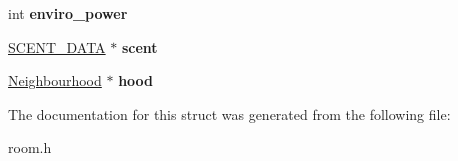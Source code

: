 \begin{DoxyCompactItemize}
\item 
\hypertarget{structroom__data_a1332388c4d8e9b6e70d4694c0c6fd7be}{int {\bfseries enviro\-\_\-power}}\label{structroom__data_a1332388c4d8e9b6e70d4694c0c6fd7be}

\item 
\hypertarget{structroom__data_a811c49ce5b3a76c01002b6137a2a95e8}{\hyperlink{structscent__data}{S\-C\-E\-N\-T\-\_\-\-D\-A\-T\-A} $\ast$ {\bfseries scent}}\label{structroom__data_a811c49ce5b3a76c01002b6137a2a95e8}

\item 
\hypertarget{structroom__data_a80cb0226783e1671bd5ba01f4d93ade9}{\hyperlink{classNeighbourhood}{Neighbourhood} $\ast$ {\bfseries hood}}\label{structroom__data_a80cb0226783e1671bd5ba01f4d93ade9}

\end{DoxyCompactItemize}


The documentation for this struct was generated from the following file\-:\begin{DoxyCompactItemize}
\item 
room.\-h\end{DoxyCompactItemize}
